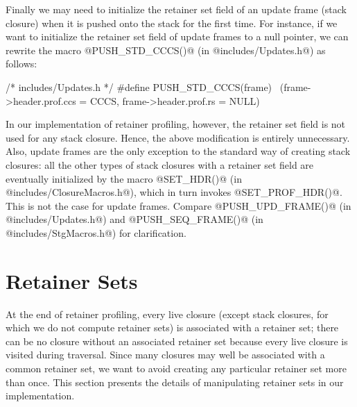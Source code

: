 \documentclass{article}
\begin{document}
%
%
%

Finally we may need to initialize the retainer set field of an update frame 
(stack closure) when it is pushed onto the stack for the first time. 
For instance, if we want to initialize the retainer set field of update
frames to a null pointer, we can rewrite the macro @PUSH_STD_CCCS()@ 
(in @includes/Updates.h@) as follows:

\begin{code}
/* includes/Updates.h */
#define PUSH_STD_CCCS(frame)            \
  (frame->header.prof.ccs = CCCS, frame->header.prof.rs = NULL)
\end{code}

In our implementation of retainer profiling, however, the retainer set field is not 
used for any stack closure.
Hence, the above modification is entirely unnecessary.
Also, update frames are the only exception to the standard way of creating
stack closures: all the other types of stack closures with a retainer set 
field are eventually initialized by
the macro @SET\_HDR()@ (in @includes/ClosureMacros.h@), which in turn
invokes @SET\_PROF\_HDR()@. This is not the case for update frames.
Compare @PUSH\_UPD\_FRAME()@ (in @includes/Updates.h@) and  
@PUSH\_SEQ\_FRAME()@ (in @includes/StgMacros.h@) for clarification.

\section{Retainer Sets}

At the end of retainer profiling, every live closure (except stack
closures, for which we do not compute retainer sets) is associated with
a retainer set; there can be no closure without an associated retainer set
because every live closure is visited during traversal.
Since many closures may well be associated with a common retainer set,
we want to avoid creating any particular retainer set more than once.
This section presents the details of manipulating retainer sets in our
implementation.
\end{document}

